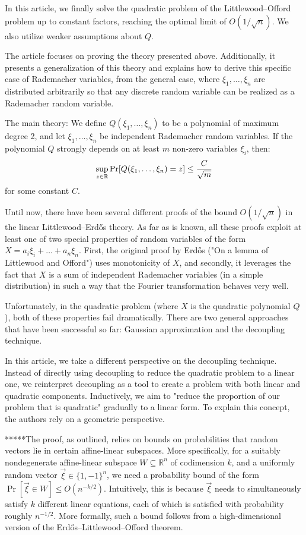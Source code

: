 In this article, we finally solve the quadratic problem of the Littlewood–Offord problem up to constant factors, reaching the optimal limit of $O(1/\sqrt{n})$. We also utilize weaker assumptions about $Q$.
 
The article focuses on proving the theory presented above. Additionally, it presents a generalization of this theory and explains how to derive this specific case of Rademacher variables, from the general case, where $\xi_1,\ldots,\xi_n$ are distributed arbitrarily so that any discrete random variable can be realized as a Rademacher random variable.
 
The main theory: We define $Q(\xi_1,\ldots,\xi_n)$ to be a polynomial of maximum degree 2, and let $\xi_1,\ldots,\xi_n$ be independent Rademacher random variables. If the polynomial $Q$ strongly depends on at least $m$ non-zero variables $\xi_i$, then:
\vspace{-0.36\baselineskip}
\[ \sup_{z\in\mathbb{R}} \Pr[Q(\xi_1,\ldots,\xi_n) = z] \leq \frac{C}{\sqrt{m}} \vspace{-0.5\baselineskip} \] for some constant $C$.
 
Until now, there have been several different proofs of the bound $O(1/\sqrt{n})$ in the linear Littlewood–Erdős theory. As far as is known, all these proofs exploit at least one of two special properties of random variables of the form $X = a_i \xi_i + \ldots + a_n \xi_n$. First, the original proof by Erdős ("On a lemma of Littlewood and Offord") uses monotonicity of $X$, and secondly, it leverages the fact that $X$ is a sum of independent Rademacher variables (in a simple distribution) in such a way that the Fourier transformation behaves very well.
 
Unfortunately, in the quadratic problem (where $X$ is the quadratic polynomial $Q$), both of these properties fail dramatically. There are two general approaches that have been successful so far: Gaussian approximation and the decoupling technique.
 
In this article, we take a different perspective on the decoupling technique. Instead of directly using decoupling to reduce the quadratic problem to a linear one, we reinterpret decoupling as a tool to create a problem with both linear and quadratic components. Inductively, we aim to "reduce the proportion of our problem that is quadratic" gradually to a linear form. To explain this concept, the authors rely on a geometric perspective.
 
*****The proof, as outlined, relies on bounds on probabilities that random vectors lie in certain affine-linear subspaces. More specifically, for a suitably nondegenerate affine-linear subspace $W \subseteq \mathbb{R}^n$ of codimension $k$, and a uniformly random vector $\vec{\xi} \in \{1,-1\}^n$, we need a probability bound of the form $\Pr[\vec{\xi} \in W] \leq O(n^{-k/2})$. Intuitively, this is because $\vec{\xi}$ needs to simultaneously satisfy $k$ different linear equations, each of which is satisfied with probability roughly $n^{-1/2}$. More formally, such a bound follows from a high-dimensional version of the Erdős–Littlewood–Offord theorem.
 
